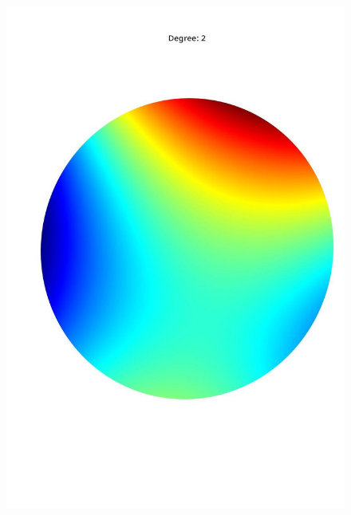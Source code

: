 \documentclass[a4paper]{article}
\theoremstyle{definition}
\begin{document}
\begin{figure}[h!]
\begin{minipage}{.245\textwidth}
        \centering
        \includegraphics[width=0.95\linewidth]{media/med_2.jpg}
        \label{fig:med2}
    \end{minipage}
    \begin{minipage}{.245\textwidth}
        \centering

\end{minipage}
\end{figure}
\end{document}

